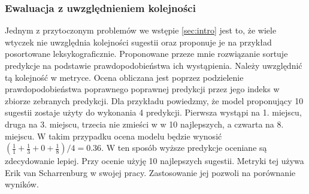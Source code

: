 \subsubsection{Ewaluacja z uwzględnieniem kolejności}
Jednym z przytoczonym problemów we wstępie \ref{sec:intro} jest to, że wiele wtyczek nie uwzględnia kolejności sugestii oraz proponuje je na przykład posortowane leksykograficznie. Proponowane przeze mnie rozwiązanie 
sortuje predykcje na podstawie prawdopodobieństwa ich wystąpienia. Należy uwzględnić tą kolejność w metryce. Ocena obliczana jest poprzez podzielenie prawdopodobieństwa poprawnego poprawnej predykcji przez 
jego indeks w zbiorze zebranych predykcji. Dla przykładu powiedzmy, że model proponujący 10 sugestii zostaje użyty do wykonania 4 predykcji. Pierwsza wystąpi na 1. miejscu, druga na 3. miejscu, trzecia nie zmieści w w 10 najlepszych, 
a czwarta na 8. miejscu. W takim przypadku ocena modelu będzie wynosić \begin{math}(\frac{1}{1}+ \frac{1}{3}+ 0 +\frac{1}{8})/4 = 0.36\end{math}. W ten sposób wyższe predykcje oceniane są zdecydowanie lepiej.
Przy ocenie użyję 10 najlepszych sugestii.  Metryki tej używa Erik van Scharrenburg \cite{erik} w swojej pracy. Zastosowanie jej pozwoli na porównanie wyników. 

